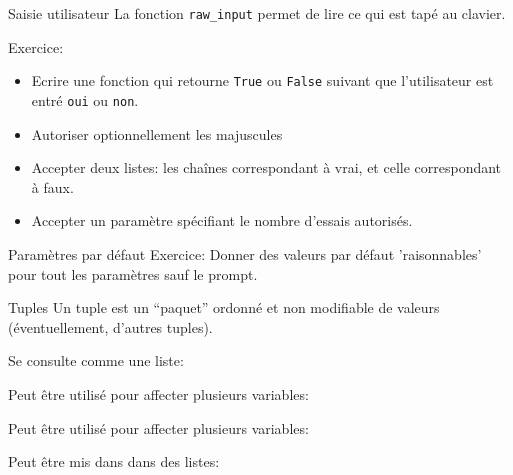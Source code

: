\documentclass{beamer}
\begin{document}
\begin{frame}{Saisie utilisateur}
  La fonction {\tt raw\_input} permet de lire ce qui est tapé au clavier.

  Exercice:
  \begin{itemize}
  \item Ecrire une fonction qui retourne {\tt True} ou {\tt False} suivant que l'utilisateur est entré {\tt oui} ou {\tt non}.
  \item Autoriser optionnellement les majuscules
  \item Accepter deux listes: les chaînes correspondant à vrai, et celle correspondant à faux.
  \item Accepter un paramètre spécifiant le nombre d'essais autorisés.
  \end{itemize}
\end{frame}

 \begin{frame}{Paramètres par défaut}
   Exercice: Donner des valeurs par défaut 'raisonnables' pour tout les paramètres sauf le prompt.
 \end{frame}


\begin{frame}{Tuples}
  Un tuple est un ``paquet'' ordonné et non modifiable de valeurs (éventuellement, d'autres tuples).
  
  
  Se consulte comme une liste:
  
  Peut être utilisé pour affecter plusieurs variables:
  
  Peut être utilisé pour affecter plusieurs variables:
  
  Peut être mis dans dans des listes:
\end{frame}
\end{document}
